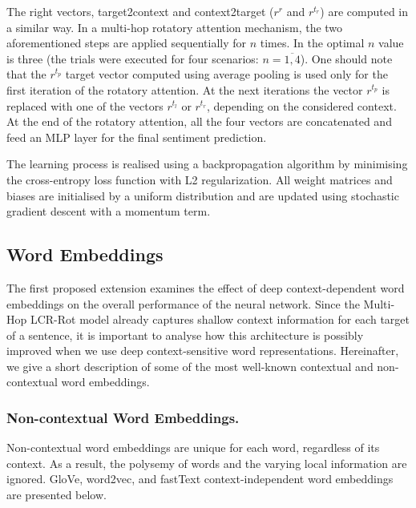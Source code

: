 \documentclass[hidelinks]{llncs}
\begin{document}
The right vectors, target2context and context2target ($r^r$ and $r^{t_r}$) are computed in a similar way. In a multi-hop rotatory attention mechanism, the two aforementioned steps are applied sequentially for $n$ times. In \cite{wallaart2019hybrid} the optimal $n$ value is three (the trials were executed for four scenarios: $n = \overline{1,4}$). One should note that the $r^{t_p}$ target vector computed using average pooling is used only for the first iteration of the rotatory attention. At the next iterations the vector $r^{t_p}$ is replaced with one of the vectors $r^{t_l}$ or $r^{t_r}$, depending on the considered context. At the end of the rotatory attention, all the four vectors are concatenated and feed an MLP layer for the final sentiment prediction. 

The learning process is realised using a backpropagation algorithm by minimising the cross-entropy loss function with L2 regularization. All weight matrices and biases are initialised by a uniform distribution and are updated using stochastic gradient descent with a momentum term. 


\subsection{Word Embeddings}\label{Embeddings}

The first proposed extension examines the effect of deep context-dependent word embeddings on the overall performance of the neural network. Since the Multi-Hop LCR-Rot model already captures shallow context information for each target of a sentence, it is important to analyse how this architecture is possibly improved when we use deep context-sensitive word representations. Hereinafter, we give a short description of some of the most well-known contextual and non-contextual word embeddings.


\subsubsection{Non-contextual Word Embeddings. }Non-contextual word embeddings are unique for each word, regardless of its context. As a result, the polysemy of words and the varying local information are ignored. GloVe, word2vec, and fastText context-independent word embeddings are presented below.
\end{document}
